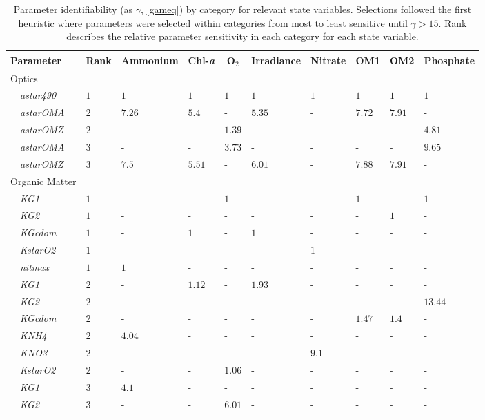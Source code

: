 \documentclass[letterpaper,12pt,oneside]{article}\usepackage[]{graphicx}\usepackage[]{color}
\begin{document}
\begin{table}[!tbp]
{\footnotesize
\caption{Parameter identifiability (as $\gamma$, \cref{gameq}) by category for relevant state variables.  Selections followed the first heuristic where parameters were selected within categories from most to least sensitive until $\gamma > 15$.  Rank describes the relative parameter sensitivity in each category for each state variable.\label{tab:heurist1}} 
\begin{center}
\begin{tabular}{llllllllll}
\hline\hline
\multicolumn{1}{l}{Parameter}&\multicolumn{1}{c}{Rank}&\multicolumn{1}{c}{Ammonium}&\multicolumn{1}{c}{Chl-\textit{a}}&\multicolumn{1}{c}{O$_2$}&\multicolumn{1}{c}{Irradiance}&\multicolumn{1}{c}{Nitrate}&\multicolumn{1}{c}{OM1}&\multicolumn{1}{c}{OM2}&\multicolumn{1}{c}{Phosphate}\tabularnewline
\hline
{Optics}&&&&&&&&&\tabularnewline
~~\footnotesize{\textit{astar490}}&$1$&$1$&$1$&$1$&$1$&$1$&$1$&$1$&$1$\tabularnewline
~~\footnotesize{\textit{astarOMA}}&$2$&$7.26$&$5.4$&-&$5.35$&-&$7.72$&$7.91$&-\tabularnewline
~~\footnotesize{\textit{astarOMZ}}&$2$&-&-&$1.39$&-&-&-&-&$4.81$\tabularnewline
~~\footnotesize{\textit{astarOMA}}&$3$&-&-&$3.73$&-&-&-&-&$9.65$\tabularnewline
~~\footnotesize{\textit{astarOMZ}}&$3$&$7.5$&$5.51$&-&$6.01$&-&$7.88$&$7.91$&-\tabularnewline
\hline
{Organic Matter}&&&&&&&&&\tabularnewline
~~\footnotesize{\textit{KG1}}&$1$&-&-&$1$&-&-&$1$&-&$1$\tabularnewline
~~\footnotesize{\textit{KG2}}&$1$&-&-&-&-&-&-&$1$&-\tabularnewline
~~\footnotesize{\textit{KGcdom}}&$1$&-&$1$&-&$1$&-&-&-&-\tabularnewline
~~\footnotesize{\textit{KstarO2}}&$1$&-&-&-&-&$1$&-&-&-\tabularnewline
~~\footnotesize{\textit{nitmax}}&$1$&$1$&-&-&-&-&-&-&-\tabularnewline
~~\footnotesize{\textit{KG1}}&$2$&-&$1.12$&-&$1.93$&-&-&-&-\tabularnewline
~~\footnotesize{\textit{KG2}}&$2$&-&-&-&-&-&-&-&$13.44$\tabularnewline
~~\footnotesize{\textit{KGcdom}}&$2$&-&-&-&-&-&$1.47$&$1.4$&-\tabularnewline
~~\footnotesize{\textit{KNH4}}&$2$&$4.04$&-&-&-&-&-&-&-\tabularnewline
~~\footnotesize{\textit{KNO3}}&$2$&-&-&-&-&$9.1$&-&-&-\tabularnewline
~~\footnotesize{\textit{KstarO2}}&$2$&-&-&$1.06$&-&-&-&-&-\tabularnewline
~~\footnotesize{\textit{KG1}}&$3$&$4.1$&-&-&-&-&-&-&-\tabularnewline
~~\footnotesize{\textit{KG2}}&$3$&-&-&$6.01$&-&-&-&-&-\tabularnewline

\end{tabular}
\end{center}}
\end{table}
\end{document}
